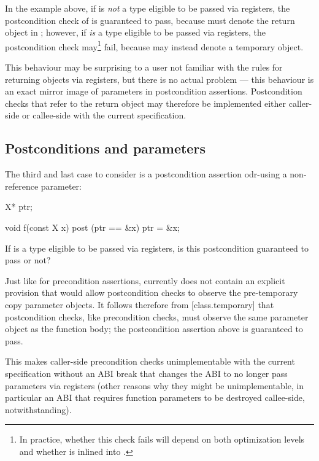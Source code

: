 In the example above, if  is \emph{not} a type eligible to be passed via registers, the postcondition check of  is guaranteed to pass, because  must denote the return object  in ; however, if  \emph{is} a type eligible to be passed via registers, the postcondition check may\footnote{In practice, whether this check fails will depend on both optimization levels and whether  is inlined into .} fail, because  may instead denote a temporary object.

This behaviour may be surprising to a user not familiar with the rules for returning objects via registers, but there is no actual problem --- this behaviour is an exact mirror image of parameters in postcondition assertions. Postcondition checks that refer to the return object may therefore be implemented either caller-side or callee-side with the current specification.

\subsection{Postconditions and parameters}

The third and last case to consider is a postcondition assertion odr-using a non-reference parameter:

\begin{codeblock}
X* ptr;

void f(const X x) post (ptr == &x) {
  ptr = &x;
}
\end{codeblock}

If  is a type eligible to be passed via registers, is this postcondition guaranteed to pass or not?

Just like for precondition assertions, \cite{P2900R10} currently does not contain an explicit provision that would allow postcondition checks to observe the pre-temporary copy parameter objects. It follows therefore from [class.temporary] that postcondition checks, like precondition checks, must observe the same parameter object as the function body; the postcondition assertion above is guaranteed to pass.

This makes caller-side precondition checks unimplementable with the current specification without an ABI break that changes the ABI to no longer pass parameters via registers (other reasons why they might be unimplementable, in particular an ABI that requires function parameters to be destroyed callee-side, notwithstanding).

